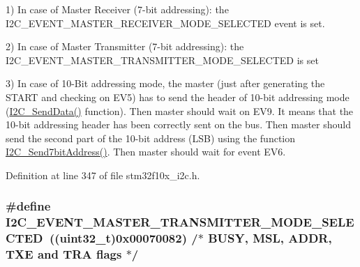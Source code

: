 1) In case of Master Receiver (7-\/bit addressing)\+: the I2\+C\+\_\+\+E\+V\+E\+N\+T\+\_\+\+M\+A\+S\+T\+E\+R\+\_\+\+R\+E\+C\+E\+I\+V\+E\+R\+\_\+\+M\+O\+D\+E\+\_\+\+S\+E\+L\+E\+C\+T\+ED event is set.

2) In case of Master Transmitter (7-\/bit addressing)\+: the I2\+C\+\_\+\+E\+V\+E\+N\+T\+\_\+\+M\+A\+S\+T\+E\+R\+\_\+\+T\+R\+A\+N\+S\+M\+I\+T\+T\+E\+R\+\_\+\+M\+O\+D\+E\+\_\+\+S\+E\+L\+E\+C\+T\+ED is set

3) In case of 10-\/\+Bit addressing mode, the master (just after generating the S\+T\+A\+RT and checking on E\+V5) has to send the header of 10-\/bit addressing mode (\hyperlink{group___i2_c___private___functions_ga7bd9e70b8eafde0dd5eb42b0d95fe1a9}{I2\+C\+\_\+\+Send\+Data()} function). Then master should wait on E\+V9. It means that the 10-\/bit addressing header has been correctly sent on the bus. Then master should send the second part of the 10-\/bit address (L\+SB) using the function \hyperlink{group___i2_c___private___functions_ga009fc2a5b2313c36da39ece39a1156a6}{I2\+C\+\_\+\+Send7bit\+Address()}. Then master should wait for event E\+V6. 

Definition at line 347 of file stm32f10x\+\_\+i2c.\+h.

\subsubsection[{\texorpdfstring{I2\+C\+\_\+\+E\+V\+E\+N\+T\+\_\+\+M\+A\+S\+T\+E\+R\+\_\+\+T\+R\+A\+N\+S\+M\+I\+T\+T\+E\+R\+\_\+\+M\+O\+D\+E\+\_\+\+S\+E\+L\+E\+C\+T\+ED}{I2C_EVENT_MASTER_TRANSMITTER_MODE_SELECTED}}]{\setlength{\rightskip}{0pt plus 5cm}\#define I2\+C\+\_\+\+E\+V\+E\+N\+T\+\_\+\+M\+A\+S\+T\+E\+R\+\_\+\+T\+R\+A\+N\+S\+M\+I\+T\+T\+E\+R\+\_\+\+M\+O\+D\+E\+\_\+\+S\+E\+L\+E\+C\+T\+ED~(({\bf uint32\+\_\+t})0x00070082)  /$\ast$ B\+U\+S\+Y, M\+S\+L, A\+D\+D\+R, T\+X\+E and T\+R\+A flags $\ast$/}\hypertarget{group___i2_c___events_ga2361a6e60b7dc86fb682dd06fbd3edb7}{}\label{group___i2_c___events_ga2361a6e60b7dc86fb682dd06fbd3edb7}


